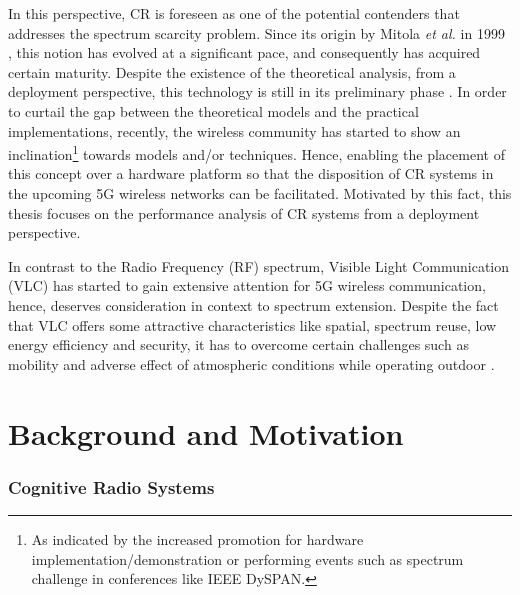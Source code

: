 In this perspective, CR is foreseen as one of the potential contenders that addresses the spectrum scarcity problem. Since its origin by Mitola \textit{et al.} in 1999 \cite{Mitola99}, this notion has evolved at a significant pace, and consequently has acquired certain maturity. Despite the existence of the theoretical analysis, from a deployment perspective, this technology is still in its preliminary phase \cite{Pawe11}. In order to curtail the gap between the theoretical models and the practical implementations, recently, the wireless community has started to show an inclination\footnote{As indicated by the increased promotion for hardware implementation/demonstration or performing events such as spectrum challenge in conferences like IEEE DySPAN.} towards models and/or techniques. Hence, enabling the placement of this concept over a hardware platform so that the disposition of CR systems in the upcoming 5G wireless networks can be facilitated. Motivated by this fact, this thesis focuses on the performance analysis of CR systems from a deployment perspective. 

In contrast to the Radio Frequency (RF) spectrum, Visible Light Communication (VLC) has started to gain extensive attention for 5G wireless communication, hence, deserves consideration in context to spectrum extension. Despite the fact that VLC offers some attractive characteristics like spatial, spectrum reuse, low energy efficiency and security, it has to overcome certain challenges such as mobility and adverse effect of atmospheric conditions while operating outdoor \cite{Wu14}. 


\section{Background and Motivation}
\label{sec:mot}

\subsubsection*{Cognitive Radio Systems}


